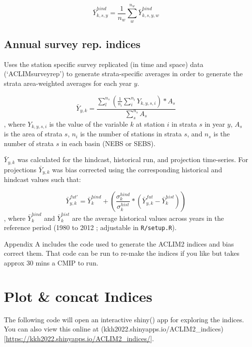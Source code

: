 \documentclass[
]{article}
\begin{document}
\[\bar{Y}^{hind}_{k,s,y} = \frac{1}{n_w}\sum^{n_w}_{w}\bar{Y}^{hind}_{k,s,y,w}\]

\hypertarget{annual-survey-rep.-indices}{%
\subsection{Annual survey rep.
indices}\label{annual-survey-rep.-indices}}

Uses the station specific survey replicated (in time and space) data
(`ACLIMsurveyrep') to generate strata-specific averages in order to
generate the strata area-weighted averages for each year \(y\).

\[\bar{Y}_{y,k}= \frac{\sum^{n_s}_{l}(\frac{1}{n_i}\sum^{n_i}_{i}Y_{k,y,s,i})*A_s} {\sum^{n_s}_{s}{A_s}}\],
where \(Y_{k,y,s,i}\) is the value of the variable \(k\) at station
\(i\) in strata \(s\) in year \(y\), \(A_s\) is the area of strata
\(s\), \(n_i\) is the number of stations in strata \(s\), and \(n_s\) is
the number of strata \(s\) in each basin (NEBS or SEBS).

\(\bar{Y}_{y,k}\) was calculated for the hindcast, historical run, and
projection time-series. For projections \(\bar{Y}_{y,k}\) was bias
corrected using the corresponding historical and hindcast values such
that:

\[\bar{Y}^{fut'}_{y,k} =\bar{Y}^{hind}_{k} +\left( \frac{\sigma^{hind}_{k}}{\sigma^{hist}_{k}}*(\bar{Y}^{fut}_{y,k}-\bar{Y}^{hist}_{k})  \right )\],
where \(\bar{Y}^{hind}_{k}\) and \(\bar{Y}^{hist}_{k}\) are the average
historical values across years in the reference period (1980 to 2012 ;
adjustable in \texttt{R/setup.R}).

Appendix A includes the code used to generate the ACLIM2 indices and
bias correct them. That code can be run to re-make the indices if you
like but takes approx 30 mins a CMIP to run.

\hypertarget{plot-concat-indices}{%
\section{Plot \& concat Indices}\label{plot-concat-indices}}

The following code will open an interactive shiny() app for exploring
the indices. You can also view this online at
(kkh2022.shinyapps.io/ACLIM2\_indices){[}\url{https://kkh2022.shinyapps.io/ACLIM2_indices/}{]}.
\end{document}

